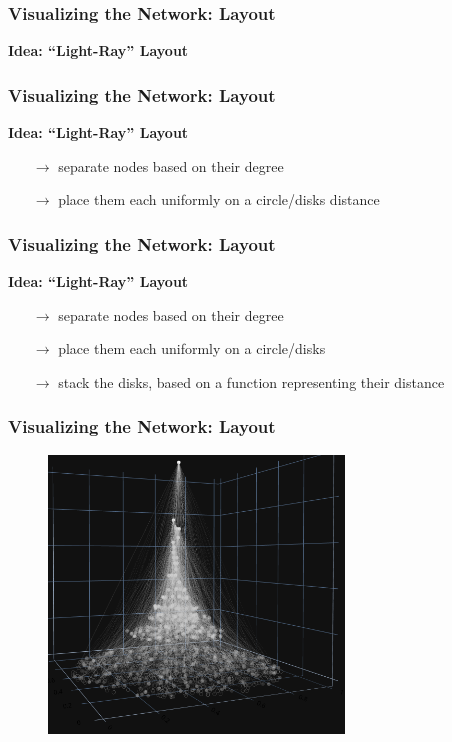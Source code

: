 \documentclass[fleqn]{beamer}
\begin{document}
    \begin{frame}
        \frametitle{Visualizing the Network: Layout}
        \centering \textbf{Idea: ``Light-Ray'' Layout}
    \end{frame}

    \begin{frame}
        \frametitle{Visualizing the Network: Layout}
        \centering \textbf{Idea: ``Light-Ray'' Layout}
        \begin{itemize}
            \item[$\to$] separate nodes based on their degree
            \item[$\to$] place them each uniformly on a circle/disks
                distance
        \end{itemize}
    \end{frame}

    \begin{frame}
        \frametitle{Visualizing the Network: Layout}
        \centering \textbf{Idea: ``Light-Ray'' Layout}
        \begin{itemize}
            \item[$\to$] separate nodes based on their degree
            \item[$\to$] place them each uniformly on a circle/disks
            \item[$\to$] stack the disks, based on a function representing their
                distance
        \end{itemize}
    \end{frame}

    \begin{frame}
        \frametitle{Visualizing the Network: Layout}
        \begin{figure}[htpb]
            \centering
            \includegraphics[width=0.7\textwidth]{./pics/plot_sqrt.png}
        \end{figure}
    \end{frame}
\end{document}
